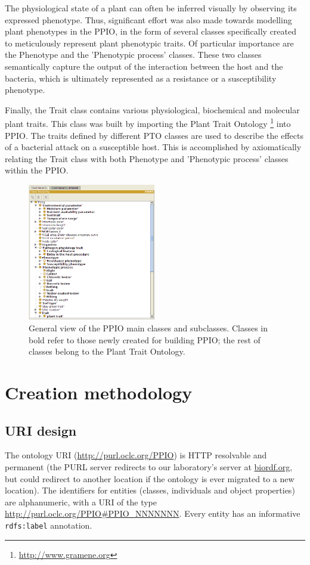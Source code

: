 \documentclass[sw]{iosart2c}
\newcommand{\myurl}[1]{\footnote{\url{#1}}}
\newcommand{\con}[1]{\texttt{#1}\xspace}
\begin{document}
The physiological state of a plant can often be inferred visually by observing its expressed phenotype. Thus, significant effort was also made towards modelling plant phenotypes in the PPIO, in the form of several classes specifically created to meticulously represent plant phenotypic traits.  Of particular importance are the {\sf Phenotype} and the {\sf 'Phenotypic process'} classes. These two classes semantically capture the output of the interaction between the host and the bacteria, which is ultimately represented as a resistance or a susceptibility phenotype.

Finally, the {\sf Trait} class contains various physiological, biochemical and molecular plant traits. This class was built by importing the Plant Trait Ontology \myurl{http://www.gramene.org} \cite{PTO} into PPIO. The traits defined by different PTO classes are used to describe the effects of a bacterial attack on a susceptible host. This is accomplished by axiomatically relating the {\sf Trait} class with both {\sf Phenotype} and {\sf 'Phenotypic process'} classes within the PPIO.

\begin{figure}
\includegraphics[width=0.5\textwidth]{PPIO-classes2.png}
\caption{General view of the PPIO main classes and subclasses. Classes in bold refer to those newly created for building PPIO; the rest of classes belong to the Plant Trait Ontology.}\label{fig:ppio-classes}
\end{figure}


\section{Creation methodology}

\subsection{URI design}
The ontology URI (\url{http://purl.oclc.org/PPIO}) is HTTP resolvable and permanent (the PURL server redirects to our laboratory's server at \url{biordf.org}, but could redirect to another location if the ontology is ever migrated to a new location). The identifiers for entities (classes, individuals and object properties) are alphanumeric, with a URI of the type \url{http://purl.oclc.org/PPIO#PPIO_NNNNNNN}. Every entity has an informative \con{rdfs:label} annotation. 
\end{document}
